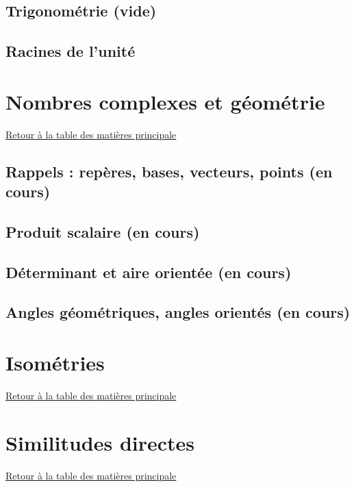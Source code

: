 \documentclass[11pt,a4paper,oneside]{book}
\newcommand{\retourTOC}{Retour à la table des matières principale}
\theoremstyle{definition}
\theoremstyle{plain}
\begin{document}
\section{Trigonométrie (vide)}


\section{Racines de l'unité}
\label{sec:cyclotomie}



\chapter{Nombres complexes et géométrie}
\minitoc
\hyperlink{toc}{\retourTOC}

\section{Rappels : repères, bases, vecteurs, points (en cours)}
\label{sec:rappels_geom}


\section{Produit scalaire (en cours)}
\label{sec:produit_scalaire}


\section{Déterminant et aire orientée (en cours)}
\label{sec:determinant}


\section{Angles géométriques, angles orientés (en cours)}
\label{sec:angles}


\chapter{Isométries}
\minitoc
\hyperlink{toc}{\retourTOC}



\chapter{Similitudes directes}
\minitoc
\hyperlink{toc}{\retourTOC}
\end{document}

